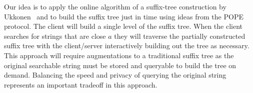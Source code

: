 Our idea is to apply the online algorithm of a suffix-tree construction by
Ukkonen~\cite{Ukkonen95} and to build the suffix tree just in time using
ideas from the POPE protocol.  The client will build a single level of the
suffix tree.  When the client searches for strings that are close $a$ they will
traverse the partially constructed suffix tree with the client/server
interactively building out the tree as necessary.  This approach will require
augmentations to a traditional suffix tree as the original searchable string
must be stored and queryable to build the tree on demand.  Balancing the speed
and privacy of querying the original string represents an important tradeoff in
this approach.
